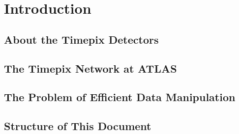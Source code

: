 \chapter{Introduction}

\section{About the Timepix Detectors}

\section{The Timepix Network at ATLAS}

\section{The Problem of Efficient Data Manipulation}

\section{Structure of This Document}
